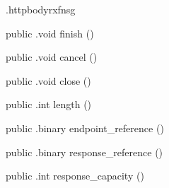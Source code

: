 \begin{CrexxClass}{.httpbody}{rxfnsg}
\begin{Members}
    \Method
      {public}
      {.void}
      {finish}
      {()}

    \Method
      {public}
      {.void}
      {cancel}
      {()}

    \Method
      {public}
      {.void}
      {close}
      {()}

    \Method
      {public}
      {.int}
      {length}
      {()}

    \Method
      {public}
      {.binary}
      {endpoint\_reference}
      {()}

    \Method
      {public}
      {.binary}
      {response\_reference}
      {()}

    \Method
      {public}
      {.int}
      {response\_capacity}
      {()}

  \end{Members}
\end{CrexxClass}

